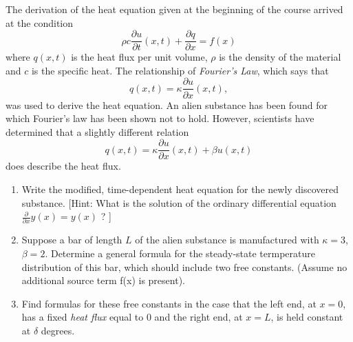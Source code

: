 
The derivation of the heat equation given at the beginning of the course arrived at the condition 
\[
\rho c \frac{\partial u}{\partial t} (x,t) + \frac{\partial q}{\partial x} = f(x)
\]
where $q(x,t)$ is the heat flux per unit volume, $\rho$ is the density of the material and $c$ is the specific heat.  The relationship of \textit{Fourier's Law}, which says that 
\[
q(x,t) = \kappa \frac{\partial u}{\partial x}(x,t),
\]
was used to derive the heat equation.  An alien substance has been found for which Fourier's law has been shown not to hold.  However, scientists have determined that a slightly different relation 
\[
q(x,t) = \kappa\frac{\partial u}{\partial x}(x,t) + \beta u(x,t)
\]
does describe the heat flux.

\begin{enumerate}
\item Write the modified, time-dependent heat equation for the newly discovered substance.  [Hint: What is the solution of the ordinary differential equation $\frac{\partial}{\partial x}y(x) = y(x)$ ? ]

\item Suppose a bar of length $L$ of the alien substance is manufactured with $\kappa = 3$, $\beta = 2$.  Determine a general formula for the steady-state termperature distribution of this bar, which should include two free constants.  (Assume no additional source term f(x) is present).

\item Find formulas for these free constants in the case that the left end, at $x=0$, has a fixed \textit{heat flux} equal to $0$ and the right end, at $x=L$, is held constant at $\delta$ degrees.

%
%

\end{enumerate}